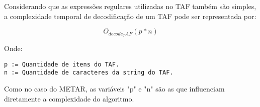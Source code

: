 Considerando que as expressões regulares utilizadas no TAF também são simples, a complexidade
temporal de decodificação de um TAF pode ser representada por:

$$ O_{decode_TAF}(p * n)$$

Onde:

\begin{verbatim}
p := Quantidade de itens do TAF.
n := Quantidade de caracteres da string do TAF.
\end{verbatim}

Como no caso do METAR, as variáveis "p" e "n" são as que influenciam diretamente a
complexidade do algoritmo.